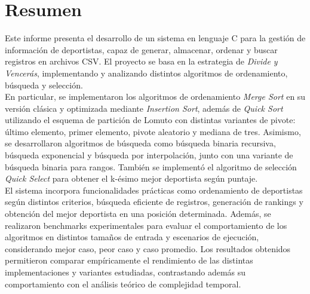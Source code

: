 \chapter*{Resumen}

Este informe presenta el desarrollo de un sistema en lenguaje C para la gestión de información de deportistas, capaz de generar, almacenar, ordenar 
y buscar registros en archivos CSV. El proyecto se basa en la estrategia de \textit{Divide y Vencerás}, implementando y analizando distintos algoritmos 
de ordenamiento, búsqueda y selección.  \\

En particular, se implementaron los algoritmos de ordenamiento \textit{Merge Sort} en su versión clásica y optimizada mediante \textit{Insertion Sort}, 
además de \textit{Quick Sort} utilizando el esquema de partición de Lomuto con distintas variantes de pivote: último elemento, primer elemento, pivote 
aleatorio y mediana de tres.  Asimismo, se desarrollaron algoritmos de búsqueda como búsqueda binaria recursiva, búsqueda exponencial y búsqueda por 
interpolación, junto con una variante de búsqueda binaria para rangos. También se implementó el algoritmo de selección \textit{Quick Select} para obtener 
el k-ésimo mejor deportista según puntaje.  \\

El sistema incorpora funcionalidades prácticas como ordenamiento de deportistas según distintos criterios, búsqueda eficiente de registros, generación de 
rankings y obtención del mejor deportista en una posición determinada. Además, se realizaron benchmarks experimentales para evaluar el comportamiento de los 
algoritmos en distintos tamaños de entrada y escenarios de ejecución, considerando mejor caso, peor caso y caso promedio.  Los resultados obtenidos
permitieron comparar empíricamente el rendimiento de las distintas implementaciones y variantes estudiadas, contrastando además su comportamiento con el 
análisis teórico de complejidad temporal.